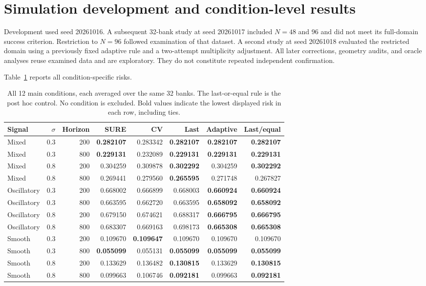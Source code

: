 \documentclass[pdflatex,sn-mathphys-ay]{sn-jnl}
\theoremstyle{remark}\newtheorem{remark}[theorem]{Remark}
\begin{document}
\section{Simulation development and condition-level results}
Development used seed 20261016. A subsequent 32-bank study at seed 20261017 included $N=48$ and 96 and did not meet its full-domain success criterion. Restriction to $N=96$ followed examination of that dataset. A second study at seed 20261018 evaluated the restricted domain using a previously fixed adaptive rule and a two-attempt multiplicity adjustment. All later corrections, geometry audits, and oracle analyses reuse examined data and are exploratory. They do not constitute repeated independent confirmation.

Table~\ref{tab:cells} reports all condition-specific risks.

\begin{table}[t]\centering\small
\setlength{\tabcolsep}{4.3pt}
\caption{All 12 main conditions, each averaged over the same 32 banks. The last-or-equal rule is the post hoc control. No condition is excluded. Bold values indicate the lowest displayed risk in each row, including ties.}\label{tab:cells}
\begin{tabular}{lrrrrrrr}\toprule Signal & $\sigma$ & Horizon & SURE & CV & Last & Adaptive & Last/equal\\\midrule
Mixed & 0.3 & 200 & \textbf{0.282107} & 0.283342 & \textbf{0.282107} & \textbf{0.282107} & \textbf{0.282107}\\
Mixed & 0.3 & 800 & \textbf{0.229131} & 0.232089 & \textbf{0.229131} & \textbf{0.229131} & \textbf{0.229131}\\
Mixed & 0.8 & 200 & 0.304259 & 0.309878 & \textbf{0.302292} & 0.304259 & \textbf{0.302292}\\
Mixed & 0.8 & 800 & 0.269441 & 0.279560 & \textbf{0.265595} & 0.271748 & 0.267827\\
Oscillatory & 0.3 & 200 & 0.668002 & 0.666899 & 0.668003 & \textbf{0.660924} & \textbf{0.660924}\\
Oscillatory & 0.3 & 800 & 0.663595 & 0.662720 & 0.663595 & \textbf{0.658092} & \textbf{0.658092}\\
Oscillatory & 0.8 & 200 & 0.679150 & 0.674621 & 0.688317 & \textbf{0.666795} & \textbf{0.666795}\\
Oscillatory & 0.8 & 800 & 0.683307 & 0.669163 & 0.698173 & \textbf{0.665308} & \textbf{0.665308}\\
Smooth & 0.3 & 200 & 0.109670 & \textbf{0.109647} & 0.109670 & 0.109670 & 0.109670\\
Smooth & 0.3 & 800 & \textbf{0.055099} & 0.055131 & \textbf{0.055099} & \textbf{0.055099} & \textbf{0.055099}\\
Smooth & 0.8 & 200 & 0.133629 & 0.136482 & \textbf{0.130815} & 0.133629 & \textbf{0.130815}\\
Smooth & 0.8 & 800 & 0.099663 & 0.106746 & \textbf{0.092181} & 0.099663 & \textbf{0.092181}\\
\bottomrule\end{tabular}\end{table}
\end{document}
